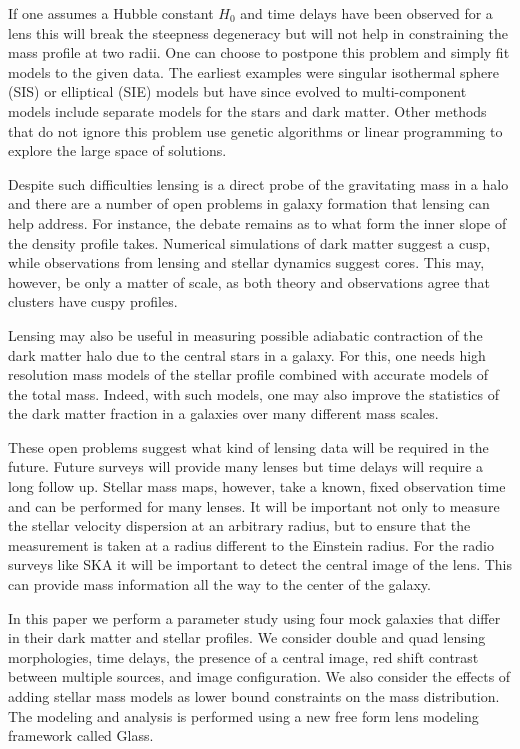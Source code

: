 \documentclass[onecolumn,galley]{mn2e}
\newcommand{\Glass}{{\sc Glass}}
\begin{document}
If one assumes a Hubble constant $H_0$ and time delays have been observed for a
lens this will break the steepness degeneracy but will not help in
constraining the mass profile at two radii.  One can choose to postpone this
problem and simply fit models to the given data.  The earliest examples were
singular isothermal sphere (SIS) or elliptical (SIE) models but have since
evolved to multi-component models include separate models for the stars and
dark matter. Other methods that do not ignore this problem use genetic
algorithms or linear programming to explore the large space of solutions.

Despite such difficulties lensing is a direct probe of the gravitating mass in
a halo and there are a number of open problems in galaxy formation that lensing
can help address. For instance, the debate remains as to what form the inner
slope of the density profile takes. Numerical simulations of dark matter
suggest a cusp, while observations from lensing and stellar dynamics suggest
cores. This may, however, be only a matter of scale, as both theory and
observations agree that clusters have cuspy profiles. 

Lensing may also be useful in measuring possible adiabatic contraction of the 
dark matter halo due to the central stars in a galaxy. For this, one needs
high resolution mass models of the stellar profile combined with accurate models
of the total mass. Indeed, with such models, one may also improve the statistics
of the dark matter fraction in a galaxies over many different mass scales.

These open problems suggest what kind of lensing data will be required in the
future.  Future surveys will provide many lenses but time delays will require a
long follow up. Stellar mass maps, however, take a known, fixed observation
time and can be performed for many lenses. It will be important not only to
measure the stellar velocity dispersion at an arbitrary radius, but to ensure
that the measurement is taken at a radius different to the Einstein radius.
For the radio surveys like SKA it will be important to detect the central image
of the lens. This can provide mass information all the way to the center of the
galaxy.

In this paper we perform a parameter study using four mock galaxies that differ
in their dark matter and stellar profiles. We consider double and quad lensing
morphologies, time delays, the presence of a central image, red shift contrast
between multiple sources, and image configuration.  We also consider the
effects of adding stellar mass models as lower bound constraints on the mass
distribution.  The modeling and analysis is performed using a new free form
lens modeling framework called \Glass. 
\end{document}
